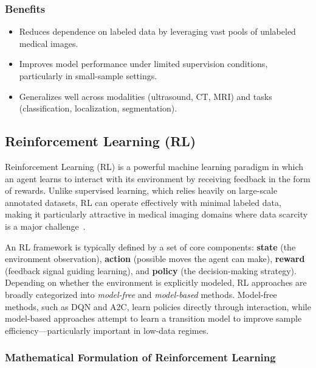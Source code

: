 \documentclass{article}
\begin{document}
\subsubsection{Benefits}
\begin{itemize}
    \item Reduces dependence on labeled data by leveraging vast pools of unlabeled medical images.
    \item Improves model performance under limited supervision conditions, particularly in small-sample settings.
    \item Generalizes well across modalities (ultrasound, CT, MRI) and tasks (classification, localization, segmentation).
\end{itemize}

\subsection{Reinforcement Learning (RL)}

Reinforcement Learning (RL) is a powerful machine learning paradigm in which an agent learns to interact with its environment by receiving feedback in the form of rewards. Unlike supervised learning, which relies heavily on large-scale annotated datasets, RL can operate effectively with minimal labeled data, making it particularly attractive in medical imaging domains where data scarcity is a major challenge~\cite{huReinforcementLearningMedical2023}.

An RL framework is typically defined by a set of core components: \textbf{state} (the environment observation), \textbf{action} (possible moves the agent can make), \textbf{reward} (feedback signal guiding learning), and \textbf{policy} (the decision-making strategy). Depending on whether the environment is explicitly modeled, RL approaches are broadly categorized into \textit{model-free} and \textit{model-based} methods. Model-free methods, such as DQN\cite{mnihHumanlevelControlDeep2015a} and A2C\cite{Schulman2017ProximalPO,Mnih2016AsynchronousMF}, learn policies directly through interaction, while model-based approaches attempt to learn a transition model to improve sample efficiency—particularly important in low-data regimes.

\subsubsection{Mathematical Formulation of Reinforcement Learning}
\end{document}
